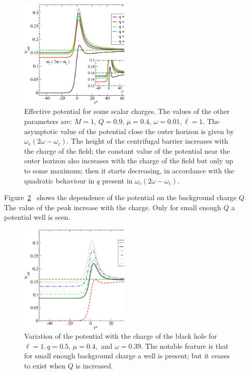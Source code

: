 \documentclass[aps, prd, twocolumn, amsmath, floats,floatfix, superscriptaddress,
nofootinbib, showpacs]{revtex4-1}
\begin{document}
\begin{figure}[!ht]
\includegraphics[width=0.47\textwidth]{m0.4_Q0.8_qs_w0.39.eps} 
\caption{Effective potential for some scalar charges. The values of the other
parameters are: $M=1,\,Q=0.9,\, \mu=0.4,\, \omega=0.01, \ell=1$. The  asymptotic value 
of the
potential close the outer horizon is given by $\omega_c(2\omega-\omega_c)$. The
height of the centrifugal barrier increases with the charge of the field; the constant 
value of the potential near the outer horizon also increases with the charge of the field
but only up to some maximum; then it starts decreasing, in accordance with the quadratic
behaviour in $q$ present in $\omega_c(2\omega-\omega_c)$.}
\label{fig:pot_char}
\end{figure}

Figure~\ref{fig:pot_hbchar} \  shows the dependence of the potential on the background
charge $Q$. The value of the peak increase with the charge. Only for small enough $Q$ a
potential well is seen. 



\begin{figure}[!ht]
\includegraphics[width=0.47\textwidth]{m0.4_Qs_q0.5_w0.39.eps}
\caption{Variation of the potential with the charge of the black hole for
$\ell = 1$.$\,q=0.5,\, \mu=0.4,$ and $\omega=0.39$. The notable feature is that for small
enough background charge a well is present; but it ceases to exist when $Q$ is increased.}
\label{fig:pot_hbchar}
\end{figure}
\end{document}
